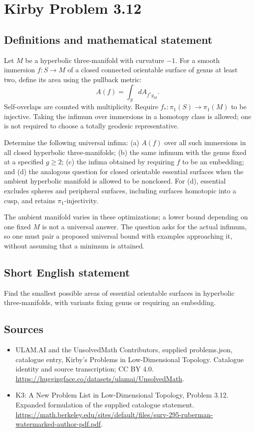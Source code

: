 \documentclass[11pt,a4paper]{article}
\begin{document}
\section*{Kirby Problem 3.12}\label{statement}

\subsection{Definitions and mathematical statement}
Let $M$ be a hyperbolic three-manifold with curvature $-1$. For a smooth
immersion $f:S\to M$ of a closed connected orientable surface of genus at
least two, define its area using the pullback metric:
\[
 A(f)=\int_S dA_{f^*g_M}.
\]
Self-overlaps are counted with multiplicity. Require $f_*:\pi_1(S)\to\pi_1(M)$
to be injective. Taking the infimum over immersions in a homotopy class is
allowed; one is not required to choose a totally geodesic representative.

Determine the following universal infima: (a) $A(f)$ over all such immersions
in all closed hyperbolic three-manifolds; (b) the same infimum with the genus
fixed at a specified $g\geq2$; (c) the infima obtained by requiring $f$ to be
an embedding; and (d) the analogous question for closed orientable essential
surfaces when the ambient hyperbolic manifold is allowed to be nonclosed.
For (d), essential excludes spheres and peripheral surfaces, including
surfaces homotopic into a cusp, and retains $\pi_1$-injectivity.

The ambient manifold varies in these optimizations; a lower bound depending
on one fixed $M$ is not a universal answer. The question asks for the actual
infimum, so one must pair a proposed universal bound with examples approaching
it, without assuming that a minimum is attained.
\subsection{Short English statement}
Find the smallest possible areas of essential orientable surfaces in hyperbolic three-manifolds, with variants fixing genus or requiring an embedding.
\subsection{Sources}
\begin{itemize}
\item[S1] ULAM.AI and the UnsolvedMath Contributors, supplied problems.json, catalogue entry, Kirby's Problems in Low-Dimensional Topology. Catalogue identity and source transcription; CC BY 4.0.
\url{https://huggingface.co/datasets/ulamai/UnsolvedMath}.
\item[S2] K3: A New Problem List in Low-Dimensional Topology, Problem 3.12. Expanded formulation of the supplied catalogue statement.
\url{https://math.berkeley.edu/sites/default/files/surv-295-ruberman-watermarked-author-pdf.pdf}.
\end{itemize}
\end{document}
